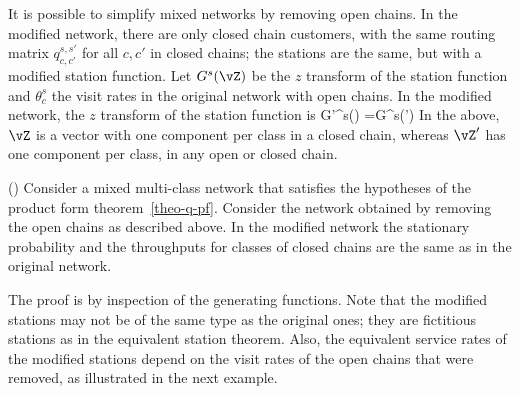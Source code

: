 It is possible to simplify mixed networks by removing open
chains. In the modified network, there are only closed chain
customers, with the same routing matrix $q^{s,s'}_{c,c'}$ for
all $c,c'$ in closed chains; the stations are the same, but
with a modified station function. Let $G^s(\vZ)$ be the $z$
transform of the station function and $\theta^s_c$ the visit
rates in the original network with open chains. In the modified
network, the $z$ transform of the station function is
  \be
  G'^s(\vZ) =G^s(\vZ') \mwith
  \ee
In the above, $\vZ$ is a vector with one
component per class in a closed chain, whereas
$\vZ'$ has one component per class, in any open
or closed chain.
 \begin{shadethm}()
Consider a mixed multi-class network that
satisfies the hypotheses of the product form
theorem~\ref{theo-q-pf}. Consider the network
obtained by removing the open chains as described
above. In the modified network the stationary
probability and the throughputs for classes of
closed chains are the same as in the original
network. \label{theo-q-qnet-rem-op}
 \end{shadethm}

The proof is by inspection of the generating
functions. Note that the modified stations may
not be of the same type as the original ones;
they are fictitious stations as in the equivalent
station theorem. Also, the equivalent service
rates of the modified stations depend on the
visit rates of the open chains that were removed,
as illustrated in the next example.

